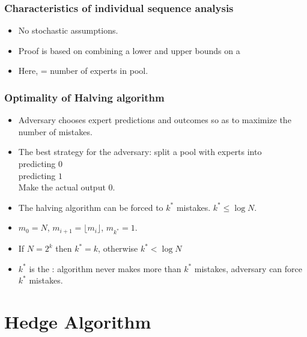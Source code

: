 \documentclass{beamer}
\begin{document}
\begin{frame}
\frametitle{Characteristics of individual sequence analysis}
\begin{itemize}
\item
No stochastic assumptions.
\item
  Proof is based on combining a lower and upper bounds on a 
\item Here,  = number of experts in pool.
\end{itemize}
\end{frame}

\begin{frame}
\frametitle{Optimality of Halving algorithm}
\begin{itemize}
\item Adversary chooses expert predictions and outcomes so as to
  maximize the number of mistakes.
\item
The best strategy for the adversary: split a pool with  experts
into \\
 predicting 0 \\
 predicting $1$\\
Make the actual output $0$.
\item The halving algorithm can be forced to $k^*$ mistakes. $k^* \leq
  \log N$.
\item {} $m_0=N$, $m_{i+1} = \lfloor m_i \rfloor$, $m_{k^*} = 1$.
\item If $N=2^k$ then $k^*=k$, otherwise $k^* < \log N$
\item $k^*$ is  the : algorithm never
  makes more than $k^*$ mistakes, adversary can force $k^*$ mistakes.
\end{itemize}
\end{frame}

\section{Hedge Algorithm}
\end{document}
